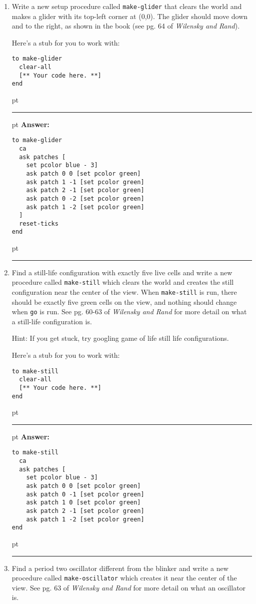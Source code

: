 \documentclass[11pt]{book}
\begin{document}
\begin{enumerate}
\item Write a new setup procedure called \texttt{make-glider} that clears the world and makes a glider with its top-left corner at (0,0). The glider should move down and to the right, as shown in the book (see pg. 64 of {\it Wilensky and Rand}).

Here's a stub for you to work with:
\begin{verbatim}
to make-glider
  clear-all
  [** Your code here. **]
end
\end{verbatim}

\ifnum{}
 pt
\hrule
{} pt
{\bf Answer: }
\begin{verbatim}
to make-glider
  ca 
  ask patches [
    set pcolor blue - 3]
    ask patch 0 0 [set pcolor green]
    ask patch 1 -1 [set pcolor green]
    ask patch 2 -1 [set pcolor green]
    ask patch 0 -2 [set pcolor green]
    ask patch 1 -2 [set pcolor green]
  ]
  reset-ticks
end
\end{verbatim}
 pt
\hrule
\fi

\item Find a still-life configuration with exactly five live cells and write a new procedure called \texttt{make-still} which clears the world and creates the still configuration near the center of the view. When \texttt{make-still} is run, there should be exactly five green cells on the view, and nothing should change when \texttt{go} is run. See pg. 60-63 of {\it Wilensky and Rand} for more detail on what a still-life configuration is.

Hint: If you get stuck, try googling game of life still life configurations.

Here's a stub for you to work with:
\begin{verbatim}
to make-still
  clear-all
  [** Your code here. **]
end
\end{verbatim}

\ifnum{}
 pt
\hrule
{} pt
{\bf Answer: }
\begin{verbatim}
to make-still
  ca 
  ask patches [
    set pcolor blue - 3]
    ask patch 0 0 [set pcolor green]
    ask patch 0 -1 [set pcolor green]
    ask patch 1 0 [set pcolor green]
    ask patch 2 -1 [set pcolor green]
    ask patch 1 -2 [set pcolor green]
end
\end{verbatim}
 pt
\hrule
\fi

\item Find a period two oscillator different from the blinker and write a new procedure called \texttt{make-oscillator} which creates it near the center of the view. See pg. 63 of {\it Wilensky and Rand} for more detail on what an oscillator is.


\end{enumerate}
\end{document}
